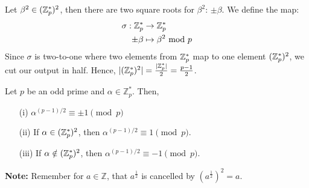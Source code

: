 \begin{Proof}
    Let $\beta^2\in(\mathbb{Z}_p^*)^2$, then there are two square roots for $\beta^2$: $\pm\beta$. We define the map:
    \begin{align*}
        \sigma: \mathbb{Z}_p^* &\to \mathbb{Z}_p^*\\
        \pm\beta &\mapsto \beta^2 \text{ mod } p
    \end{align*}
    Since $\sigma$ is two-to-one where two elements from $\mathbb{Z}_p^*$ map to one element $(\mathbb{Z}_p^*)^2$, we cut our output in half.
    Hence, $|(\mathbb{Z}_p^*)^2|=\frac{|\mathbb{Z}_p^*|}{2}=\frac{p-1}{2}$.
\end{Proof}

\newpage




\begin{theo}

    Let $p$ be an odd prime and $\alpha\in\mathbb{Z}_p^*$. Then,
    \begin{enumerate}
        \item[(i)] $\alpha^{(p-1)/2} \equiv \pm1 \pmod{p}$
        \item[(ii)] If $\alpha\in(\mathbb{Z}_p^*)^2$, then $\alpha^{(p-1)/2}\equiv 1\pmod{p}$.
        \item[(iii)] If $\alpha\notin(\mathbb{Z}_p^*)^2$, then $\alpha^{(p-1)/2}\equiv -1\pmod{p}$.
    \end{enumerate}
\end{theo}

\begin{Note}
    \textbf{Note:} Remember for $a\in\mathbb{Z}$, that $a^\frac{1}{2}$ is cancelled by $(a^\frac{1}{2})^2=a$.
\end{Note}


